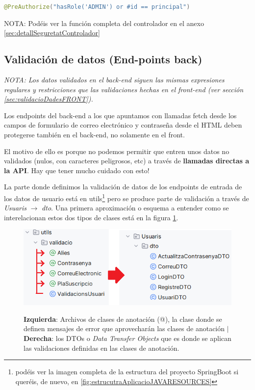 \documentclass[a4paper,12pt]{report}
\begin{document}
\begin{lstlisting}[language=java, basicstyle=\ttfamily\footnotesize, keywordstyle=\color{magenta}]
	@PreAuthorize("hasRole('ADMIN') or #id == principal")
\end{lstlisting}

	NOTA: Podéis ver la función completa del controlador en el anexo \ref{sec:detallSeguretatControlador}
	
	
		
		

		
		
			\subsection{Validación de datos (End-points back)}
			\label{sec:validacioDadesBACK}
			
			\textit{NOTA: Los datos validados en el back-end siguen las mismas expresiones regulares y restricciones que las validaciones hechas en el front-end (ver sección \ref{sec:validacioDadesFRONT}).}
			
			Los endpoints del back-end a los que apuntamos con llamadas fetch desde los campos de formulario de correo electrónico y contraseña desde el HTML deben protegerse también en el back-end, no solamente en el front.
			
			El motivo de ello es porque no podemos permitir que entren unos datos no validados (nulos, con caracteres peligrosos, etc) a través de \textbf{llamadas directas a la API}. Hay que tener mucho cuidado con esto! 
			
			La parte donde definimos la validación de datos de los endpoints de entrada de los datos de usuario está en utils\footnote{podéis ver la imagen completa de la estructura del proyecto SpringBoot si queréis, de nuevo, en \ref{fig:estrucutraAplicacioJAVARESOURCES}} pero se produce parte de validación a través de \textit{Usuaris} $\rightarrow$ \textit{dto}. Una primera aproximación o esquema a entender como se interelacionan estos dos tipos de clases está en la figura \ref{fig:validacioBackArxius}.
			
			
			
			\FloatBarrier
			\setlength{\belowcaptionskip}{3pt}
			\begin{figure}[H]
				\centering
				\caption{\textbf{Izquierda}: Archivos de clases de anotación (@), la clase donde se definen mensajes de error que aprovecharán las clases de anotación $|$  \textbf{Derecha}: los DTOs o \textit{Data Transfer Objects} que es donde se aplican las validaciones definidas en las clases de anotación.}
				\includegraphics[width=.8\linewidth]{img/validacioBackArxius.png}
				\label{fig:validacioBackArxius}
			\end{figure}
			\FloatBarrier
			
\end{document}
